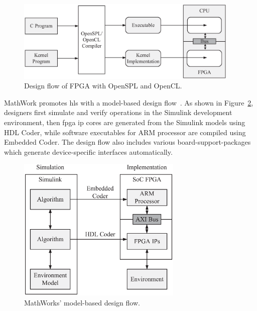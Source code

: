 \begin{figure}[ht]
\begin{center}
\includegraphics[width=0.95\textwidth]{2_background/figures/openspl}
\end{center}
\caption{Design flow of FPGA with OpenSPL and OpenCL.}
\label{fig:openspl}
\end{figure}

MathWork promotes \gls{hls} with a model-based design flow~\cite{mathworks,sharma09}.
As shown in Figure~\ref{fig:hdlcoder}, designers first simulate and verify operations in the Simulink development environment, then \gls{fpga} \gls{ip} cores are generated from the Simulink models using HDL Coder, while software executables for ARM processor are compiled using Embedded Coder.
The design flow also includes various board-support-packages which generate device-specific interfaces automatically.

\begin{figure}[ht]
\begin{center}
\includegraphics[width=0.7\textwidth]{2_background/figures/hdlcoder}
\end{center}
\caption{MathWorks' model-based design flow.}
\label{fig:hdlcoder}
\end{figure}

